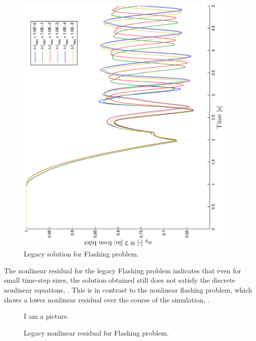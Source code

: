 \begin{figure}[h!t!]
\begin{center}
\includegraphics[width=0.95\textwidth]{images/cobra_flashing_al_2in.eps}
\end{center}
\caption{Legacy solution for Flashing problem.}
\label{fig:cobra_mode_flashing}
\end{figure}

The nonlinear residual for the legacy Flashing problem indicates that even for small time-step sizes, the solution obtained still does not satisfy the discrete nonlinear equations, .
This is in contrast to the nonlinear flashing problem, which shows a lower nonlinear residual over the course of the simulation, .

\begin{figure}[h!t]
\begin{center}
I am a picture.
\end{center}
\caption{Legacy \cobra{} nonlinear residual for Flashing problem.}
\label{fig:legacy_flashing_residual}
\end{figure}

